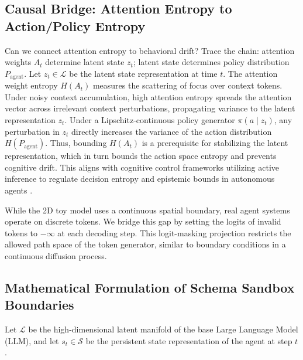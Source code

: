 \documentclass[10pt,journal,compsoc]{IEEEtran}
\begin{document}
\subsection{Causal Bridge: Attention Entropy to Action/Policy Entropy}
Can we connect attention entropy to behavioral drift? Trace the chain: attention weights $A_t$ determine latent state $z_t$; latent state determines policy distribution $P_{\text{agent}}$. Let $z_t \in \mathcal{L}$ be the latent state representation at time $t$. The attention weight entropy $H(A_t)$ measures the scattering of focus over context tokens. Under noisy context accumulation, high attention entropy spreads the attention vector across irrelevant context perturbations, propagating variance to the latent representation $z_t$. Under a Lipschitz-continuous policy generator $\pi(a \mid z_t)$, any perturbation in $z_t$ directly increases the variance of the action distribution $H(P_{\text{agent}})$. Thus, bounding $H(A_t)$ is a prerequisite for stabilizing the latent representation, which in turn bounds the action space entropy and prevents cognitive drift. This aligns with cognitive control frameworks utilizing active inference to regulate decision entropy \cite{wang2024tcds} and epistemic bounds in autonomous agents \cite{zhang2025tcds, smith2023tcds}.

While the 2D toy model uses a continuous spatial boundary, real agent systems operate on discrete tokens. We bridge this gap by setting the logits of invalid tokens to $-\infty$ at each decoding step. This logit-masking projection restricts the allowed path space of the token generator, similar to boundary conditions in a continuous diffusion process.

\subsection{Mathematical Formulation of Schema Sandbox Boundaries}
Let $\mathcal{L}$ be the high-dimensional latent manifold of the base Large Language Model (LLM), and let $s_t \in \mathcal{S}$ be the persistent state representation of the agent at step $t$. 
\end{document}
